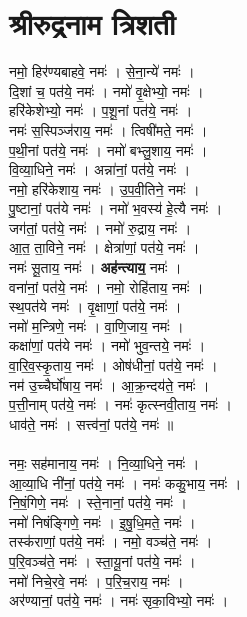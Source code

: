 \section{श्रीरुद्रनाम त्रिशती}
नमो॒ हिर॑ण्यबाहवे॒ नमः॑ । से॒ना॒न्ये॑  नमः॑ ।\\
दि॒शां च॒ पत॑ये॒ नमः॑ । नमो॑ वृ॒क्षेभ्यो॒ नमः॑ ।\\
हरि॑केशेभ्यो॒  नमः॑ । प॒शू॒नां पत॑ये॒  नमः॑ ।\\
नमः॑ स॒स्पिञ्ज॑राय॒ नमः॑ । त्विषी॑मते॒ नमः॑ ।\\
प॒थी॒नां पत॑ये॒ नमः॑ । नमो॑ बभ्लु॒शाय॒ नमः॑ ।\\
वि॒व्या॒धिने॒ नमः॑ । अन्ना॑नां॒ पत॑ये॒ नमः॑ ।\\
नमो॒ हरि॑केशाय॒ नमः॑ । उ॒प॒वी॒तिने॒ नमः॑ ।\\
पु॒ष्टानां॒ पत॑ये नमः॑ । नमो॑ भ॒वस्य॑ हे॒त्यै नमः॑ ।\\
जग॑तां॒ पत॑ये॒ नमः॑ । नमो॑ रु॒द्राय॒ नमः॑ ।\\
आ॒त॒ ता॒विने॒ नमः॑ । क्षेत्रा॑णां॒ पत॑ये॒ नमः॑ ।\\
नमः॑ सू॒ताय॒ नमः॑ । \textbf{अह॑न्त्याय॒} नमः॑ ।\\
वना॑नां॒  पत॑ये॒ नमः॑ । नमो॒ रोहि॑ताय॒ नमः॑ ।\\
स्थ॒पत॑ये नमः॑ । वृ॒क्षाणां॒ पत॑ये॒ नमः॑ ।\\
नमो॑ म॒न्त्रिणे॒ नमः॑ । वा॒णि॒जाय॒ नमः॑ ।\\
कक्षा॑णां॒ पत॑ये नमः॑ । नमो॑ भुव॒न्तये॒ नमः॑ ।\\
वा॒रि॒व॒स्कृ॒ताय॒ नमः॑ । ओष॑धीनां॒ पत॑ये॒ नमः॑ ।\\
नम॑ उ॒च्चैर्घो॑षाय॒ नमः॑ । आ॒क्र॒न्दय॑ते॒ नमः॑ ।\\
प॒त्ती॒नाम् पत॑ये॒ नमः॑ । नमः॑ कृत्स्नवी॒ताय॒ नमः॑ ।\\
धाव॑ते॒ नमः॑ । सत्त्व॑नां॒ पत॑ये॒ नमः॑ ॥\\
\\
नमः॒ सह॑मानाय॒ नमः॑ । नि॒व्या॒धिने॒ नमः॑ ।\\
आ॒व्या॒धि नी॑नां॒ पत॑ये॒ नमः॑ । नमः॑ ककु॒भाय॒ नमः॑ ।\\
नि॒षं॒गिणे॒ नमः॑ । स्ते॒नानां॒ पत॑ये॒ नमः॑ ।\\
नमो॑ निषंङ्गिणे॒ नमः॑ । इ॒षु॒धि॒मते॒ नमः॑ ।\\
तस्क॑राणां॒ पत॑ये॒ नमः॑ । नमो॒ वञ्च॑ते॒ नमः॑ ।\\
प॒रि॒वञ्च॑ते॒ नमः॑ । स्ता॒यू॒नां पत॑ये॒ नमः॑ ।\\
नमो॑ निचे॒रवे॒ नमः॑ । प॒रि॒च॒राय॒ नमः॑ ।\\
अर॑ण्यानां॒ पत॑ये॒ नमः॑ । नमः॑ सृका॒विभ्यो॒ नमः॑ ।\\
